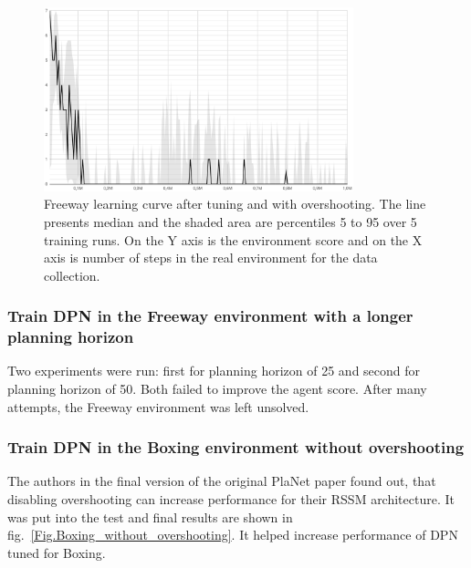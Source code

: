 \begin{figure}[H]
\includegraphics[width=0.8\textwidth,keepaspectratio]{figures/PlaNet/Freeway_with_overshooting.png}
\caption[Freeway learning curve after tuning and with overshooting]{Freeway learning curve after tuning and with overshooting. The line presents median and the shaded area are percentiles 5 to 95 over 5 training runs. On the Y axis is the environment score and on the X axis is number of steps in the real environment for the data collection.}
\label{Fig.Freeway_with_overshooting}
\end{figure}

\subsubsection{Train DPN in the Freeway environment with a longer planning horizon}

Two experiments were run: first for planning horizon of 25 and second for planning horizon of 50. Both failed to improve the agent score. After many attempts, the Freeway environment was left unsolved.

\subsubsection{Train DPN in the Boxing environment without overshooting}

The authors in the final version of the original PlaNet paper \cite{Algo.PlaNet} found out, that disabling overshooting can increase performance for their RSSM architecture. It was put into the test and final results are shown in fig.~\ref{Fig.Boxing_without_overshooting}. It helped increase performance of DPN tuned for Boxing.

